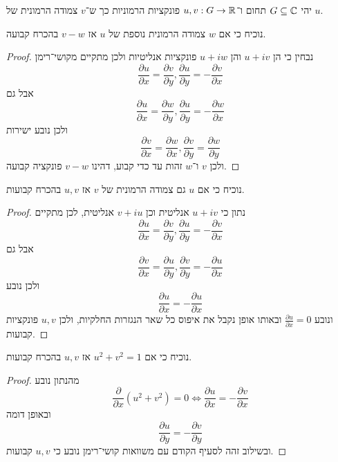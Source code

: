 \Question{}
יהי $G \subseteq \mathbb{C}$ תחום ו־$u, v : G \to \mathbb{R}$ פונקציות הרמוניות כך ש־$v$ צמודה הרמונית של $u$.

\Subquestion{}
נוכיח כי אם $w$ צמודה הרמונית נוספת של $u$ אז $v - w$ בהכרח קבועה.
\begin{proof}
	נבחין כי הן $u + i v$ והן $u + i w$ פונקציות אנליטיות ולכן מתקיים מקושי־רימן
	\[
		\frac{\partial u}{\partial x} = \frac{\partial v}{\partial y},
		\frac{\partial u}{\partial y} = -\frac{\partial v}{\partial x}
	\]
	אבל גם
	\[
		\frac{\partial u}{\partial x} = \frac{\partial w}{\partial y},
		\frac{\partial u}{\partial y} = -\frac{\partial w}{\partial x}
	\]
	ולכן נובע ישירות
	\[
		\frac{\partial v}{\partial x} = \frac{\partial w}{\partial x},
		\frac{\partial v}{\partial y} = \frac{\partial w}{\partial y}
	\]
	ולכן $v$ ו־$w$ זהות עד כדי קבוע, דהינו $v - w$ פונקציה קבועה.
\end{proof}

\Subquestion{}
נוכיח כי אם $u$ גם צמודה הרמונית של $v$ אז $u, v$ בהכרח קבועות.
\begin{proof}
	נתון כי $u + iv$ אנליטית וכן $v + iu$ אנליטית, לכן מתקיים
	\[
		\frac{\partial u}{\partial x} = \frac{\partial v}{\partial y},
		\frac{\partial u}{\partial y} = -\frac{\partial v}{\partial x}
	\]
	אבל גם
	\[
		\frac{\partial v}{\partial x} = \frac{\partial u}{\partial y},
		\frac{\partial v}{\partial y} = -\frac{\partial u}{\partial x}
	\]
	ולכן נובע
	\[
		\frac{\partial u}{\partial x} = -\frac{\partial u}{\partial x}
	\]
	ונובע $\frac{\partial u}{\partial x} = 0$ ובאותו אופן נקבל את איפוס כל שאר הנגזרות החלקיות, ולכן $u, v$ פונקציות קבועות.
\end{proof}

\Subquestion{}
נוכיח כי אם $u^2 + v^2 = 1$ אז $u, v$ בהכרח קבועות.
\begin{proof}
	מהנתון נובע
	\[
		\frac{\partial}{\partial x} (u^2 + v^2) = 0
		\iff \frac{\partial u}{\partial x} = -\frac{\partial v}{\partial x}
	\]
	ובאופן דומה
	\[
		\frac{\partial u}{\partial y} = -\frac{\partial v}{\partial y}
	\]
	ובשילוב זהה לסעיף הקודם עם משוואות קושי־רימן נובע כי $u, v$ קבועות.
\end{proof}

